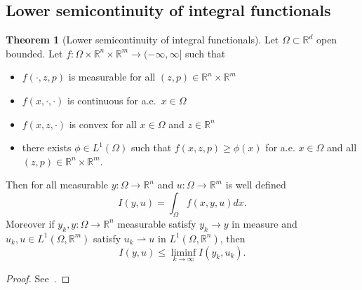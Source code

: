 \documentclass[a4paper,10pt,twoside]{amsbook}
\numberwithin{section}{chapter}
\numberwithin{equation}{chapter}
\theoremstyle{definition}
\newtheorem{thm}[prop]{Theorem}
\DeclarePairedDelimiter{\norm}{\lVert}{\rVert}
\begin{document}
%
%

\subsection{Lower semicontinuity of integral functionals}

\begin{thm}[Lower semicontinuity of integral functionals]
\label{thm:lower-semicontinuity-integral-functional}
Let $\Omega\subset\mathbb{R}^d$ open bounded. Let $f\colon\Omega\times\mathbb{R}^n\times\mathbb{R}^m\to(-\infty,\infty]$ such that
\begin{itemize}
\item[(i)] $f(\cdot,z,p)$ is measurable for all $(z,p)\in\mathbb{R}^n\times\mathbb{R}^m$
\item[(ii)] $f(x,\cdot,\cdot)$ is continuous for a.e.\ $x\in\Omega$
\item[(iii)] $f(x,z,\cdot)$ is convex for all $x\in\Omega$ and $z\in\mathbb{R}^n$
\item[(iv)] there exists $\phi\in L^1(\Omega)$ such that $f(x,z,p)\ge\phi(x)$ for a.e. $x\in\Omega$ and all $(z,p)\in\mathbb{R}^n\times\mathbb{R}^m$.
\end{itemize}
Then for all measurable $y\colon\Omega\to\mathbb{R}^n$ and $u\colon\Omega\to\mathbb{R}^m$ is well defined
\[
I(y,u)=\int_\Omega f(x,y,u)dx.
\]
Moreover if $y_k,y\colon\Omega\to\mathbb{R}^n$ measurable satisfy $y_k\to y$ in measure and $u_k,u\in L^1(\Omega,\mathbb{R}^m)$ satisfy $u_k\rightharpoonup u$ in $L^1(\Omega,\mathbb{R}^n)$, then
\[
I(y,u)\le\liminf_{k\to\infty}I(y_k,u_k).
\]
\end{thm}
\begin{proof}
See~\cite{eisen1979selection}.
\end{proof}
\end{document}
